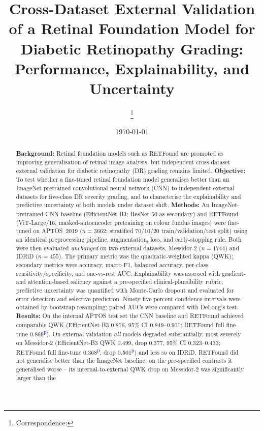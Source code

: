 \documentclass[11pt,a4paper]{article}
\title{Cross-Dataset External Validation of a Retinal Foundation Model
for Diabetic Retinopathy Grading: Performance, Explainability, and
Uncertainty}
\author[1]{\todo{Author One}}
\author[1,2]{\todo{Author Two}}
\author[1]{\todo{Corresponding Author}\thanks{Correspondence: \todo{email}}}
\affil[1]{\todo{Department, Institution, City, Country}}
\affil[2]{\todo{Second affiliation}}
\date{\today}
\newcommand{\prov}[1]{#1\textsuperscript{\textcolor{blue}{p}}} %
\begin{document}
\maketitle
\linenumbers

\begin{abstract}
\noindent\textbf{Background:} Retinal foundation models such as RETFound are
promoted as improving generalisation of retinal image analysis, but
independent cross-dataset external validation for diabetic retinopathy (DR)
grading remains limited.
\textbf{Objective:} To test whether a fine-tuned retinal foundation model
generalises better than an ImageNet-pretrained convolutional neural network
(CNN) to independent external datasets for five-class DR severity grading, and
to characterise the explainability and predictive uncertainty of both models
under dataset shift.
\textbf{Methods:} An ImageNet-pretrained CNN baseline (EfficientNet-B3;
ResNet-50 as secondary) and RETFound (ViT-Large/16, masked-autoencoder
pretraining on colour fundus images) were fine-tuned on APTOS~2019
($n=\num{3662}$; stratified 70/10/20 train/validation/test split) using an
identical preprocessing pipeline, augmentation, loss, and early-stopping rule.
Both were then evaluated \emph{unchanged} on two external datasets, Messidor-2
($n=\num{1744}$) and IDRiD ($n=455$). The primary metric was the
quadratic-weighted kappa (QWK); secondary metrics were accuracy, macro-F1,
balanced accuracy, per-class sensitivity/specificity, and one-vs-rest AUC.
Explainability was assessed with gradient- and attention-based saliency against
a pre-specified clinical-plausibility rubric; predictive uncertainty was
quantified with Monte-Carlo dropout and evaluated for error detection and
selective prediction. Ninety-five percent confidence intervals were obtained by
bootstrap resampling; paired AUCs were compared with DeLong's test.
\textbf{Results:} On the internal APTOS test set the CNN baseline and RETFound
achieved comparable QWK (EfficientNet-B3 \num{0.876}, 95\% CI
\numrange{0.849}{0.901}; RETFound full fine-tune \prov{\num{0.869}}). On external
validation \emph{all} models degraded substantially, most severely on Messidor-2
(EfficientNet-B3 QWK \num{0.499}, drop \num{0.377}, 95\% CI
\numrange{0.323}{0.433}; RETFound full fine-tune \prov{\num{0.368}}, drop
\prov{\num{0.501}}) and less so on IDRiD. RETFound did not generalise better than
the ImageNet baseline; on the pre-specified contrasts it generalised worse -- its
internal-to-external QWK drop on Messidor-2 was significantly larger than the

\end{abstract}
\end{document}
